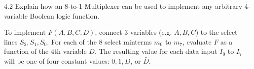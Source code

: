 \vspace{3mm}

\begin{theoryq}{4.2}
Explain how an 8-to-1 Multiplexer can be used to implement any arbitrary 4-variable Boolean logic function.
\end{theoryq}

\begin{theorysol}
To implement $F(A,B,C,D)$, connect 3 variables (e.g. $A,B,C$) to the select lines $S_2, S_1, S_0$. For each of the 8 select minterms $m_0$ to $m_7$, evaluate $F$ as a function of the 4th variable $D$. The resulting value for each data input $I_0$ to $I_7$ will be one of four constant values: $0, 1, D$, or $\bar{D}$.
\end{theorysol}

\vspace{3mm}

